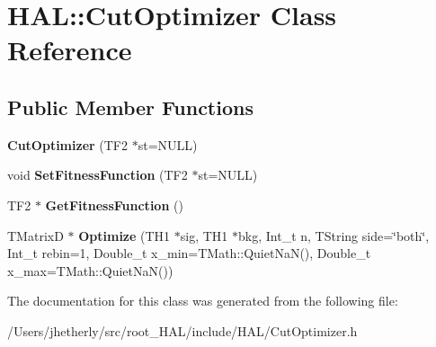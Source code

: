 \hypertarget{class_h_a_l_1_1_cut_optimizer}{\section{H\-A\-L\-:\-:Cut\-Optimizer Class Reference}
\label{class_h_a_l_1_1_cut_optimizer}
}
\subsection*{Public Member Functions}
\begin{DoxyCompactItemize}
\item 
\hypertarget{class_h_a_l_1_1_cut_optimizer_a7f1be065a4ec07a1e8cfee59dc0b80d1}{{\bfseries Cut\-Optimizer} (T\-F2 $\ast$st=N\-U\-L\-L)}\label{class_h_a_l_1_1_cut_optimizer_a7f1be065a4ec07a1e8cfee59dc0b80d1}

\item 
\hypertarget{class_h_a_l_1_1_cut_optimizer_a89082c3ec2719462ba90b3677119a1c6}{void {\bfseries Set\-Fitness\-Function} (T\-F2 $\ast$st=N\-U\-L\-L)}\label{class_h_a_l_1_1_cut_optimizer_a89082c3ec2719462ba90b3677119a1c6}

\item 
\hypertarget{class_h_a_l_1_1_cut_optimizer_a35eab754a13b06da0526fdf9900cc6eb}{T\-F2 $\ast$ {\bfseries Get\-Fitness\-Function} ()}\label{class_h_a_l_1_1_cut_optimizer_a35eab754a13b06da0526fdf9900cc6eb}

\item 
\hypertarget{class_h_a_l_1_1_cut_optimizer_a7055834b45ab96cbe30d335f7cd6f26d}{T\-Matrix\-D $\ast$ {\bfseries Optimize} (T\-H1 $\ast$sig, T\-H1 $\ast$bkg, Int\-\_\-t n, T\-String side=\char`\"{}both\char`\"{}, Int\-\_\-t rebin=1, Double\-\_\-t x\-\_\-min=T\-Math\-::\-Quiet\-Na\-N(), Double\-\_\-t x\-\_\-max=T\-Math\-::\-Quiet\-Na\-N())}\label{class_h_a_l_1_1_cut_optimizer_a7055834b45ab96cbe30d335f7cd6f26d}

\end{DoxyCompactItemize}


The documentation for this class was generated from the following file\-:\begin{DoxyCompactItemize}
\item 
/\-Users/jhetherly/src/root\-\_\-\-H\-A\-L/include/\-H\-A\-L/Cut\-Optimizer.\-h\end{DoxyCompactItemize}
